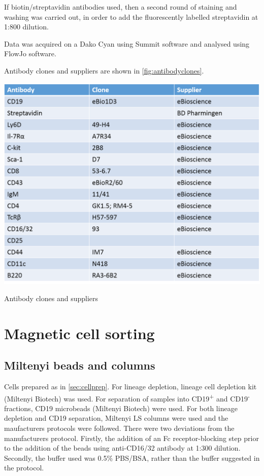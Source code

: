 If biotin/streptavidin antibodies used, then a second round of staining and washing was carried out, in order to add the fluorescently labelled streptavidin at 1:800 dilution.

Data was acquired on a Dako Cyan using Summit software and analysed using FlowJo software.

Antibody clones and suppliers are shown in \cref{fig:antibodyclones}. 

\begin{table}
\includegraphics[width=\textwidth]{Figures/Antibodyclones.png}
\caption{Antibody clones and suppliers}
\label{fig:antibodyclones}
\end{table}

\section{Magnetic cell sorting}
\label{Methods:MACSdepletion}

\subsection{Miltenyi beads and columns}

Cells prepared as in \cref{sec:cellprep}.
For lineage depletion, lineage cell depletion kit (Miltenyi Biotech) was used.
For separation of samples into CD19\textsuperscript{+} and CD19\textsuperscript{-} fractions, CD19 microbeads (Miltenyi Biotech) were used.
For both lineage depletion and CD19 separation, Miltenyi LS columns were used and the maufacturers protocols were followed.
There were two deviations from the manufacturers protocol.
Firstly, the addition of an Fc receptor-blocking step prior to the addition of the beads using anti-CD16/32 antibody at 1:300 dilution.
Secondly, the buffer used was 0.5\% PBS/BSA, rather than the buffer suggested in the protocol.

